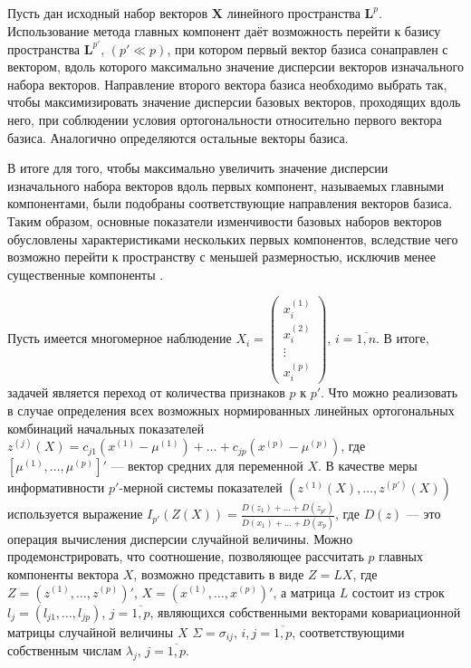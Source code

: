 Пусть дан исходный набор векторов $\pmb{X}$ линейного пространства $\pmb{L}^p$.
Использование метода главных компонент даёт возможность перейти к базису пространства $\pmb{L}^{p'}$, $(p' \ll p)$, при котором первый вектор базиса сонаправлен с вектором, вдоль которого максимально значение дисперсии векторов изначального набора векторов.
Направление второго вектора базиса необходимо выбрать так, чтобы максимизировать значение дисперсии базовых векторов, проходящих вдоль него, при соблюдении условия ортогональности относительно первого вектора базиса.
Аналогично определяются остальные векторы базиса.

В итоге для того, чтобы максимально увеличить значение дисперсии изначального набора векторов вдоль первых компонент, называемых главными компонентами, были подобраны соответствующие направления векторов базиса.
Таким образом, основные показатели изменчивости базовых наборов векторов обусловлены характеристиками нескольких первых компонентов, вследствие чего возможно перейти к пространству с меньшей размерностью, исключив менее существенные компоненты \cite{aivazyan1989prikladnaya}.

Пусть имеется многомерное наблюдение $X_i = \begin{pmatrix} x_i^{(1)} \\ x_i^{(2)} \\ \vdots \\ x_i^{(p)} \end{pmatrix}$, $i = \overline{1, n}$.
В итоге, задачей является переход от количества признаков $p$ к $p'$.
Что можно реализовать в случае определения всех возможных нормированных линейных ортогональных комбинаций начальных показателей $z^{(j)}(X) = c_{j1} (x^{(1)} - \mu^{(1)}) + \dots + c_{jp} (x^{(p)} - \mu^{(p)})$, где $[\mu^{(1)}, \dots, \mu^{(p)}]'$ --- вектор средних для переменной $X$.
В качестве меры информативности $p'$-мерной системы показателей $(z^{(1)}(X), \dots, z^{(p')}(X))$ используется выражение $I_{p'}(Z(X)) = \frac{D(z_1) + \dots + D(z_{p'})}{D(x_1) + \dots + D(x_{p})}$, где $D(z)$ --- это операция вычисления дисперсии случайной величины.
Можно продемонстрировать, что соотношение, позволяющее рассчитать $p$ главных компоненты вектора $X$, возможно представить в виде $Z = LX$, где $Z = (z^{(1)}, \dots, z^{(p)})'$, $X = (x^{(1)}, \dots, x^{(p)})'$, а матрица $L$ состоит из строк $l_j = (l_{j1}, \dots, l_{jp})$, $j = \overline{1, p}$, являющихся собственными векторами ковариационной матрицы случайной величины $X$ $\Sigma = \sigma_{ij}$, $i,j = \overline{1, p}$, соответствующими собственным числам $\lambda_j$, $j = \overline{1, p}$.

